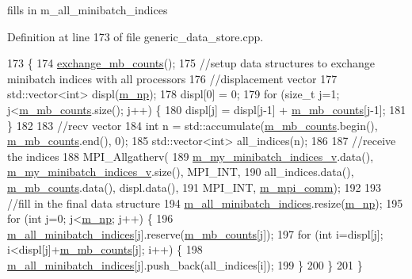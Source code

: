 fills in m\+\_\+all\+\_\+minibatch\+\_\+indices 



Definition at line 173 of file generic\+\_\+data\+\_\+store.\+cpp.


\begin{DoxyCode}
173                                              \{
174   \hyperlink{classlbann_1_1generic__data__store_abd5bf0321c063996369e1e2659bd99aa}{exchange\_mb\_counts}();
175   \textcolor{comment}{//setup data structures to exchange minibatch indices with all processors}
176   \textcolor{comment}{//displacement vector}
177   std::vector<int> displ(\hyperlink{classlbann_1_1generic__data__store_afcd4f99959c265c8c03dcf8ad3779d85}{m\_np});
178   displ[0] = 0;
179   \textcolor{keywordflow}{for} (\textcolor{keywordtype}{size\_t} j=1; j<\hyperlink{classlbann_1_1generic__data__store_a8ba0cf1a3d83d835060f45a53d77fbfd}{m\_mb\_counts}.size(); j++) \{
180     displ[j] = displ[j-1] + \hyperlink{classlbann_1_1generic__data__store_a8ba0cf1a3d83d835060f45a53d77fbfd}{m\_mb\_counts}[j-1];
181   \}
182 
183   \textcolor{comment}{//recv vector}
184   \textcolor{keywordtype}{int} n = std::accumulate(\hyperlink{classlbann_1_1generic__data__store_a8ba0cf1a3d83d835060f45a53d77fbfd}{m\_mb\_counts}.begin(), \hyperlink{classlbann_1_1generic__data__store_a8ba0cf1a3d83d835060f45a53d77fbfd}{m\_mb\_counts}.end(), 0);
185   std::vector<int> all\_indices(n);
186 
187   \textcolor{comment}{//receive the indices}
188   MPI\_Allgatherv(
189     \hyperlink{classlbann_1_1generic__data__store_a41f7fec1f1f3d6568a5765be7a6784eb}{m\_my\_minibatch\_indices\_v}.data(), 
      \hyperlink{classlbann_1_1generic__data__store_a41f7fec1f1f3d6568a5765be7a6784eb}{m\_my\_minibatch\_indices\_v}.size(), MPI\_INT, 
190     all\_indices.data(), \hyperlink{classlbann_1_1generic__data__store_a8ba0cf1a3d83d835060f45a53d77fbfd}{m\_mb\_counts}.data(), displ.data(),
191     MPI\_INT, \hyperlink{classlbann_1_1generic__data__store_ae2d2d61d5d766a7f525eedcb05e0dbf6}{m\_mpi\_comm});
192 
193   \textcolor{comment}{//fill in the final data structure}
194   \hyperlink{classlbann_1_1generic__data__store_afd21d4f029e450328f8703dd72702e73}{m\_all\_minibatch\_indices}.resize(\hyperlink{classlbann_1_1generic__data__store_afcd4f99959c265c8c03dcf8ad3779d85}{m\_np});
195   \textcolor{keywordflow}{for} (\textcolor{keywordtype}{int} j=0; j<\hyperlink{classlbann_1_1generic__data__store_afcd4f99959c265c8c03dcf8ad3779d85}{m\_np}; j++) \{
196     \hyperlink{classlbann_1_1generic__data__store_afd21d4f029e450328f8703dd72702e73}{m\_all\_minibatch\_indices}[j].reserve(\hyperlink{classlbann_1_1generic__data__store_a8ba0cf1a3d83d835060f45a53d77fbfd}{m\_mb\_counts}[j]);
197     \textcolor{keywordflow}{for} (\textcolor{keywordtype}{int} i=displ[j]; i<displ[j]+\hyperlink{classlbann_1_1generic__data__store_a8ba0cf1a3d83d835060f45a53d77fbfd}{m\_mb\_counts}[j]; i++) \{
198       \hyperlink{classlbann_1_1generic__data__store_afd21d4f029e450328f8703dd72702e73}{m\_all\_minibatch\_indices}[j].push\_back(all\_indices[i]);
199     \}
200   \}
201 \}
\end{DoxyCode}
